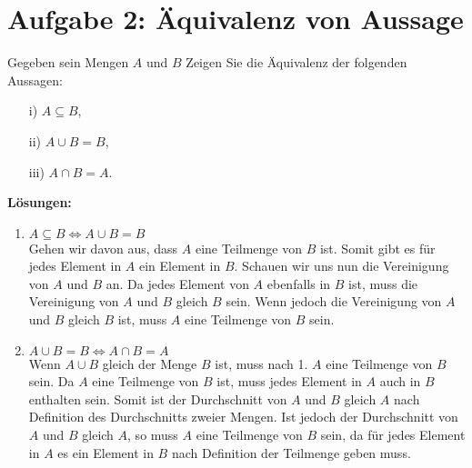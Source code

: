 \documentclass{exam}
\begin{document}
    \section*{Aufgabe 2: Äquivalenz von Aussage}
    Gegeben sein Mengen $A$ und $B$ Zeigen Sie die Äquivalenz der folgenden Aussagen:
    \begin{enumerate}
        \item[i)] $ A \subseteq B $, 
        \item[ii)] $ A \cup B = B $,
        \item[iii)] $ A \cap B = A $.
    \end{enumerate}
    \textbf{Lösungen:}
    \begin{enumerate}
        \item $ A \subseteq B \Leftrightarrow A \cup B = B $ \\ 
            Gehen wir davon aus, dass $A$ eine Teilmenge von $B$ ist. 
            Somit gibt es für jedes Element in $A$ ein Element in $B$. 
            Schauen wir uns nun die Vereinigung von $A$ und $B$ an. 
            Da jedes Element von $A$ ebenfalls in $B$ ist, muss die Vereinigung von $A$ und $B$ gleich $B$ sein.  
            Wenn jedoch die Vereinigung von $A$ und $B$ gleich $B$ ist, muss $A$ eine Teilmenge von $B$ sein.
        \item $ A \cup B = B \Leftrightarrow A \cap B = A $ \\
            Wenn $ A \cup B $ gleich der Menge $B$ ist, muss nach 1. $A$ eine Teilmenge von $B$ sein.  
            Da $A$ eine Teilmenge von $B$ ist, muss jedes Element in $A$ auch in $B$ enthalten sein. 
            Somit ist der Durchschnitt von $A$ und $B$ gleich $A$ nach Definition des Durchschnitts zweier Mengen. 
            Ist jedoch der Durchschnitt von $A$ und $B$ gleich $A$, so muss $A$ eine Teilmenge von $B$ sein,
            da für jedes Element in $A$ es ein Element in $B$ nach Definition der Teilmenge geben muss.
    \end{enumerate}
\end{document}

